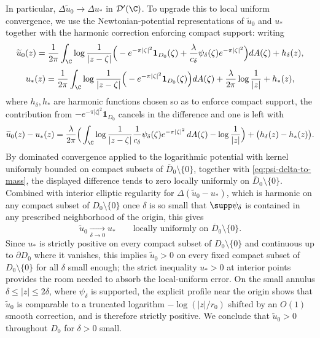In particular, $\Delta\widetilde u_0\to\Delta u_*$ in $\mathcal D'(\C)$. To upgrade this to local uniform convergence, we use the Newtonian-potential representations of $\widetilde u_0$ and $u_*$ together with the harmonic correction enforcing compact support: writing
\[
\widetilde u_0(z)
=
\frac{1}{2\pi}\int_\C \log\frac{1}{|z-\zeta|}\Big(-e^{-\pi|\zeta|^2}\mathbf 1_{D_0}(\zeta)+\frac{\lambda}{c_\delta}\psi_\delta(\zeta)e^{-\pi|\zeta|^2}\Big)dA(\zeta)+h_\delta(z),
\]
\[
u_*(z)
=
\frac{1}{2\pi}\int_\C \log\frac{1}{|z-\zeta|}\Big(-e^{-\pi|\zeta|^2}\mathbf 1_{D_0}(\zeta)\Big)dA(\zeta)+\frac{\lambda}{2\pi}\log\frac{1}{|z|}+h_*(z),
\]
where $h_\delta,h_*$ are harmonic functions chosen so as to enforce compact support, the contribution from $-e^{-\pi|\zeta|^2}\mathbf 1_{D_0}$ cancels in the difference and one is left with
\[
\widetilde u_0(z)-u_*(z)
=
\frac{\lambda}{2\pi}\Big(\int_\C \log\frac{1}{|z-\zeta|}\frac{1}{c_\delta}\psi_\delta(\zeta)e^{-\pi|\zeta|^2}\,dA(\zeta)-\log\frac{1}{|z|}\Big)+\big(h_\delta(z)-h_*(z)\big).
\]
By dominated convergence applied to the logarithmic potential with kernel uniformly bounded on compact subsets of $\overline D_0\setminus\{0\}$, together with \eqref{eq:psi-delta-to-mass}, the displayed difference tends to zero locally uniformly on $\overline D_0\setminus\{0\}$. Combined with interior elliptic regularity for $\Delta(\widetilde u_0-u_*)$, which is harmonic on any compact subset of $D_0\setminus\{0\}$ once $\delta$ is so small that $\supp\psi_\delta$ is contained in any prescribed neighborhood of the origin, this gives
\[
\widetilde u_0\xrightarrow[\delta\to 0]{}u_* \qquad \text{locally uniformly on $\overline D_0\setminus\{0\}$}.
\]
Since $u_*$ is strictly positive on every compact subset of $D_0\setminus\{0\}$ and continuous up to $\partial D_0$ where it vanishes, this implies $\widetilde u_0>0$ on every fixed compact subset of $D_0\setminus\{0\}$ for all $\delta$ small enough; the strict inequality $u_*>0$ at interior points provides the room needed to absorb the local-uniform error. On the small annulus $\delta\le|z|\le 2\delta$, where $\psi_\delta$ is supported, the explicit profile near the origin shows that $\widetilde u_0$ is comparable to a truncated logarithm $-\log(|z|/r_0)$ shifted by an $O(1)$ smooth correction, and is therefore strictly positive. We conclude that $\widetilde u_0>0$ throughout $D_0$ for $\delta>0$ small.

